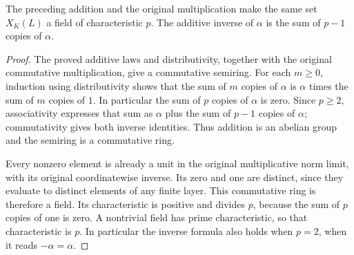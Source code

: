\begin{theorem}
\label{fw:norm-limit-field}
\leanok
The preceding addition and the original multiplication make the same
set $X_K(L)$ a field of characteristic $p$. The additive inverse of
$\alpha$ is the sum of $p-1$ copies of $\alpha$.
\end{theorem}
\begin{proof}
The proved additive laws and distributivity, together with the original
commutative multiplication, give a commutative semiring.
For each $m\geq0$, induction using distributivity shows that the sum
of $m$ copies of $\alpha$ is $\alpha$ times the sum of $m$ copies of $1$.
In particular the sum of $p$ copies of $\alpha$ is zero.
Since $p\geq2$, associativity expresses that sum as $\alpha$ plus the
sum of $p-1$ copies of $\alpha$; commutativity gives both inverse
identities. Thus addition is an abelian group and the semiring is a
commutative ring.

Every nonzero element is already a unit in the original multiplicative
norm limit, with its original coordinatewise inverse. Its zero and one
are distinct, since they evaluate to distinct elements of any finite
layer. This commutative ring is therefore a field. Its characteristic
is positive and divides $p$, because the sum of $p$ copies of one is
zero. A nontrivial field has prime characteristic, so that
characteristic is $p$. In particular the inverse formula also holds
when $p=2$, when it reads $-\alpha=\alpha$.
\end{proof}

